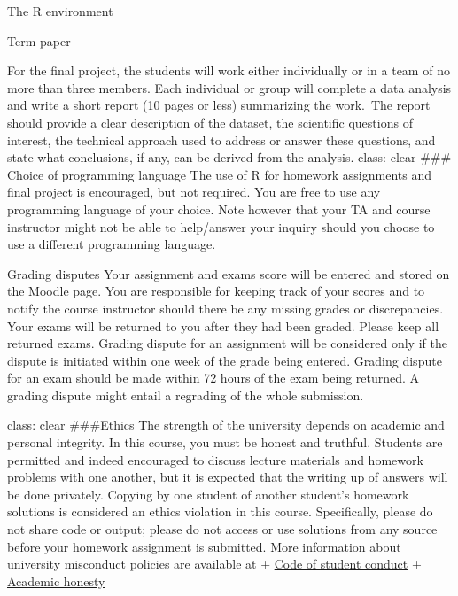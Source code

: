 \documentclass[
  ignorenonframetext,
]{beamer}
\begin{document}
\begin{frame}[fragile]{The R environment}
\begin{block}{Term paper}
\protect\hypertarget{term-paper}{}
\end{block}

\begin{block}{For the final project, the students will work either
individually or in a team of no more than three members. Each individual
or group will complete a data analysis and write a short report (10
pages or less) summarizing the work.~The report should provide a clear
description of the dataset, the scientific questions of interest, the
technical approach used to address or answer these questions, and state
what conclusions, if any, can be derived from the analysis.}
\protect\hypertarget{for-the-final-project-the-students-will-work-either-individually-or-in-a-team-of-no-more-than-three-members.-each-individual-or-group-will-complete-a-data-analysis-and-write-a-short-report-10-pages-or-less-summarizing-the-work.-the-report-should-provide-a-clear-description-of-the-dataset-the-scientific-questions-of-interest-the-technical-approach-used-to-address-or-answer-these-questions-and-state-what-conclusions-if-any-can-be-derived-from-the-analysis.}{}
class: clear \#\#\# Choice of programming language The use of R for
homework assignments and final project is encouraged, but not required.
You are free to use any programming language of your choice. Note
however that your TA and course instructor might not be able to
help/answer your inquiry should you choose to use a different
programming language.

\begin{block}{Grading disputes}
\protect\hypertarget{grading-disputes}{}
Your assignment and exams score will be entered and stored on the Moodle
page. You are responsible for keeping track of your scores and to notify
the course instructor should there be any missing grades or
discrepancies. Your exams will be returned to you after they had been
graded. Please keep all returned exams. Grading dispute for an
assignment will be considered only if the dispute is initiated within
one week of the grade being entered. Grading dispute for an exam should
be made within 72 hours of the exam being returned. A grading dispute
might entail a regrading of the whole submission.

class: clear \#\#\#Ethics The strength of the university depends on
academic and personal integrity. In this course, you must be honest and
truthful. Students are permitted and indeed encouraged to discuss
lecture materials and homework problems with one another, but it is
expected that the writing up of answers will be done privately. Copying
by one student of another student's homework solutions is considered an
ethics violation in this course. Specifically, please do not share code
or output; please do not access or use solutions from any source before
your homework assignment is submitted. More information about university
misconduct policies are available at +
\href{http://policies.ncsu.edu/policy/pol-11-35-01}{Code of student
conduct} + \href{http://policies.ncsu.edu/policy/pol-11-35-01}{Academic
honesty}


\end{block}
\end{block}
\end{frame}
\end{document}
